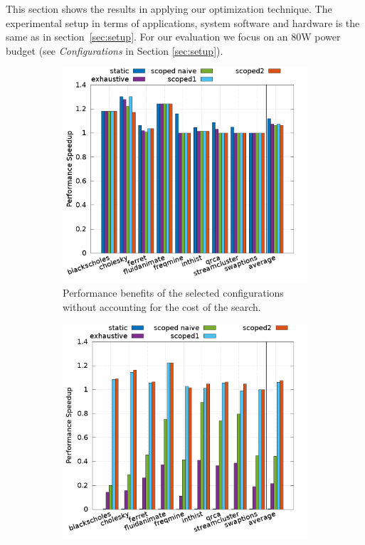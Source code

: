 
This section shows the results in applying our optimization technique.  The
experimental setup in terms of applications, system software and hardware is
the same as in section~\ref{sec:setup}.  For our evaluation we focus on an 80W
power budget (see \emph{Configurations} in Section \ref{sec:setup}). 

\begin{figure}[p]
	\centering
        \begin{subfigure}{0.7\columnwidth}
        \includegraphics[width=\columnwidth]{power_aware_runtime/figures/dynamic_conf_performance_win1000000}
        \caption{Performance benefits of the selected configurations without accounting for the cost of the search.}
        \label{fig:net_benefit}%
        \end{subfigure}
        \hfill
        \begin{subfigure}{0.7\columnwidth}
        \includegraphics[width=\columnwidth]{power_aware_runtime/figures/dynamic_conf_cost_inv_win1000000}

\end{subfigure}
\end{figure}
